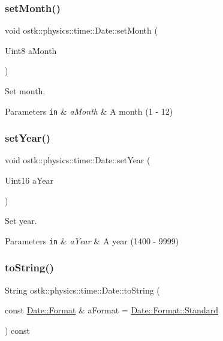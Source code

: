 \subsubsection{\texorpdfstring{set\+Month()}{setMonth()}}
{\footnotesize\ttfamily void ostk\+::physics\+::time\+::\+Date\+::set\+Month (\begin{DoxyParamCaption}\item[{Uint8}]{a\+Month }\end{DoxyParamCaption})}



Set month. 


\begin{DoxyParams}[1]{Parameters}
\mbox{\tt in}  & {\em a\+Month} & A month (1 -\/ 12) \\
\hline
\end{DoxyParams}
\mbox{\label{classostk_1_1physics_1_1time_1_1_date_a86b990462a6e3a79211b7a3c888ade04}} 
\subsubsection{\texorpdfstring{set\+Year()}{setYear()}}
{\footnotesize\ttfamily void ostk\+::physics\+::time\+::\+Date\+::set\+Year (\begin{DoxyParamCaption}\item[{Uint16}]{a\+Year }\end{DoxyParamCaption})}



Set year. 


\begin{DoxyParams}[1]{Parameters}
\mbox{\tt in}  & {\em a\+Year} & A year (1400 -\/ 9999) \\
\hline
\end{DoxyParams}
\mbox{\label{classostk_1_1physics_1_1time_1_1_date_a633d86cf7c5baf4726b08a78fbc6dd47}} 
\subsubsection{\texorpdfstring{to\+String()}{toString()}}
{\footnotesize\ttfamily String ostk\+::physics\+::time\+::\+Date\+::to\+String (\begin{DoxyParamCaption}\item[{const \hyperlink{classostk_1_1physics_1_1time_1_1_date_a77a2e52ee3bcfd7c93139d2fe2c9a141}{Date\+::\+Format} \&}]{a\+Format = {\ttfamily \hyperlink{classostk_1_1physics_1_1time_1_1_date_a77a2e52ee3bcfd7c93139d2fe2c9a141aeb6d8ae6f20283755b339c0dc273988b}{Date\+::\+Format\+::\+Standard}} }\end{DoxyParamCaption}) const}



